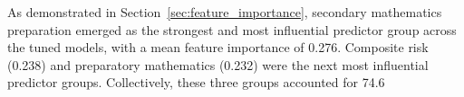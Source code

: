 As demonstrated in Section~\ref{sec:feature_importance}, secondary mathematics preparation emerged as the strongest and most influential predictor group across the tuned models, with a mean feature importance of 0.276. Composite risk (0.238) and preparatory mathematics (0.232) were the next most influential predictor groups. Collectively, these three groups accounted for 74.6%
